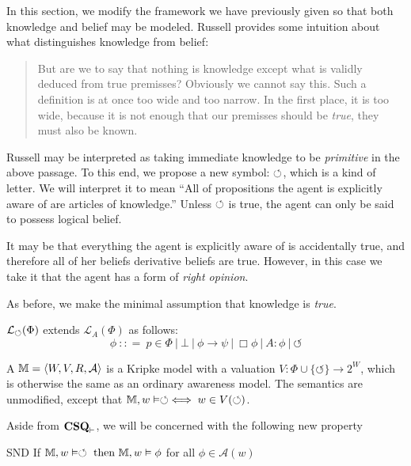 In this section, we modify the framework we have previously given so that both
knowledge and belief may be modeled.  Russell provides some intuition
about what distinguishes knowledge from belief\cite[pg. 63]{russell_problems_1936}:
\begin{quote}
But are we to say that nothing is knowledge except what is validly deduced
from true premisses? Obviously we cannot say this. Such a definition is at
once too wide and too narrow. In the first place, it is too wide, because it is
not enough that our premisses should be \emph{true}, they must also be
known.
\end{quote}
Russell may be interpreted as taking immediate knowledge to be
\emph{primitive} in the above passage.  To this end, we propose a new
symbol: $\PP$, which is a kind of letter.  We will interpret it to mean ``All of propositions
the agent is explicitly aware of are articles of knowledge.'' Unless $\PP$ is
true, the agent can only be said to possess logical belief.  

It may be that everything the agent is explicitly aware of is accidentally true,
and therefore all of her beliefs derivative beliefs are true.
However, in this case we take it that the agent has a form of
\emph{right opinion}. 

As before, we make the minimal assumption that knowledge is \emph{true}.

\begin{definition}
   $\mathcal{L}_\PP
  (\Phi)$ extends $\mathcal{L}_A(\Phi)$ as follows:
  \[ \phi \  : : = \  p \in \Phi \  | \  \bot
     \  | \  \phi \rightarrow \psi \  |
     \  \Box \phi \  | \  A : \phi \ |\ \circlearrowleft 
  \]
\end{definition}

\begin{definition}
  \label{awarenessmodels}A {} $\mathbbm{M}= \langle
  W, V, R, \mathcal{A} \rangle$ is a Kripke model with a valuation $V : \Phi
  \cup \{\circlearrowleft\} \rightarrow 2^W$, which is otherwise the
  same as an ordinary awareness model.  The semantics are unmodified,
  except that $\mathbb{M},w \models \PP \iff w \in V(\PP)$.
\end{definition}

Aside from $\textup{\textbf{CSQ}}_\vdash$, we will be concerned with
the following new property

\begin{definition}\label{snd1}
  \begin{descriptiondash}
    \item[SND] If $\mathbbm{M}, w \vDash \circlearrowleft \text{ then }
    \mathbbm{M}, w \vDash \phi$ for all $\phi \in \mathcal{A}(w)$
  \end{descriptiondash}
\end{definition}

